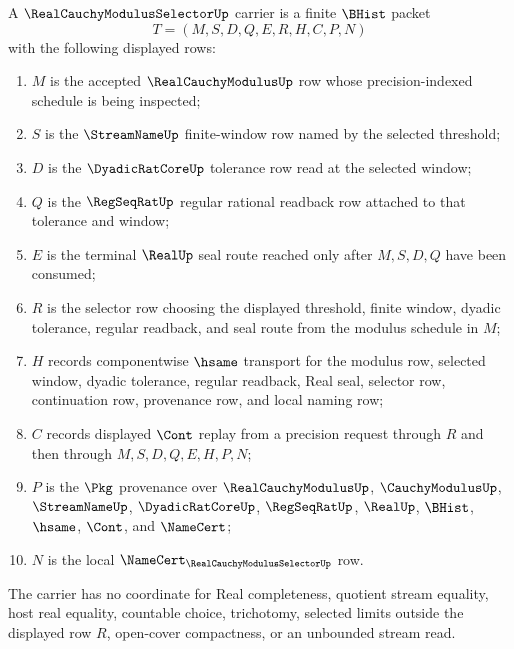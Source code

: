 \begin{definition}
\label{def:real-cauchy-modulus-selector-carrier}
A $\RealCauchyModulusSelectorUp$ carrier is a finite $\BHist$ packet
$$
T=(M,S,D,Q,E,R,H,C,P,N)
$$
with the following displayed rows:
\begin{enumerate}
\item $M$ is the accepted $\RealCauchyModulusUp$ row whose precision-indexed schedule is being inspected;
\item $S$ is the $\StreamNameUp$ finite-window row named by the selected threshold;
\item $D$ is the $\DyadicRatCoreUp$ tolerance row read at the selected window;
\item $Q$ is the $\RegSeqRatUp$ regular rational readback row attached to that tolerance and window;
\item $E$ is the terminal $\RealUp$ seal route reached only after $M,S,D,Q$ have been consumed;
\item $R$ is the selector row choosing the displayed threshold, finite window, dyadic tolerance, regular readback, and seal route from the modulus schedule in $M$;
\item $H$ records componentwise $\hsame$ transport for the modulus row, selected window, dyadic tolerance, regular readback, Real seal, selector row, continuation row, provenance row, and local naming row;
\item $C$ records displayed $\Cont$ replay from a precision request through $R$ and then through $M,S,D,Q,E,H,P,N$;
\item $P$ is the $\Pkg$ provenance over $\RealCauchyModulusUp$, $\CauchyModulusUp$, $\StreamNameUp$, $\DyadicRatCoreUp$, $\RegSeqRatUp$, $\RealUp$, $\BHist$, $\hsame$, $\Cont$, and $\NameCert$;
\item $N$ is the local $\NameCert_{\RealCauchyModulusSelectorUp}$ row.
\end{enumerate}
The carrier has no coordinate for Real completeness, quotient stream equality, host real equality, countable choice, trichotomy, selected limits outside the displayed row $R$, open-cover compactness, or an unbounded stream read.
\end{definition}

